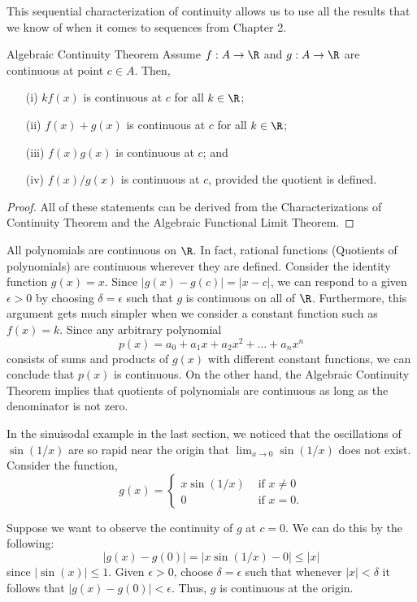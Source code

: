 This sequential characterization of continuity allows us to use all the results that we know of when it comes to sequences from Chapter 2. 


\begin{theorem}{Algebraic Continuity Theorem}{}
    Assume \( f: A \to \R  \) and \( g: A \to \R  \) are continuous at point \( c \in A  \). Then, 
    \begin{enumerate}
        \item[(i)] \( kf(x)  \) is continuous at \( c  \) for all \( k \in \R  \);
        \item[(ii)] \( f(x) + g(x) \) is continuous at \( c  \) for all \( k \in \R  \);
        \item[(iii)] \( f(x) g(x) \) is continuous at \( c  \); and 
        \item[(iv)] \( f(x) / g(x)  \) is continuous at \( c  \), provided the quotient is defined.
    \end{enumerate}
    \end{theorem}

\begin{proof}
All of these statements can be derived from the Characterizations of Continuity Theorem and the Algebraic Functional Limit Theorem.
\end{proof}


\begin{example}{}{}
All polynomials are continuous on \( \R  \). In fact, rational functions (Quotients of polynomials) are continuous wherever they are defined. Consider the identity function \( g(x) = x  \). Since \( | g(x) - g(c) | = | x - c  |  \), we can respond to a given \( \epsilon > 0 \) by choosing \( \delta = \epsilon  \) such that \( g  \) is continuous on all of \( \R  \). Furthermore, this argument gets much simpler when we consider a constant function such as \( f(x) = k  \). Since any arbitrary polynomial 
\[  p(x) = a_0 + a_1 x + a_2 x^2 + \dots + a_n x^n \]
consists of sums and products of \( g(x) \) with different constant functions, we can conclude that \( p(x) \) is continuous. On the other hand, the Algebraic Continuity Theorem implies that quotients of polynomials are continuous as long as the denominator is not zero.
\end{example}

\begin{example}{}{}
In the sinuisodal example in the last section, we noticed that the oscillations of \( \sin (1/x ) \) are so rapid near the origin that \( \lim_{ x \to 0  } \sin (1/x) \) does not exist. Consider the function, 
\[  g(x) = 
\begin{cases}
    x \sin (1/x) &\text{~if~} x \neq 0 \\ 
    0 &\text{~if~}  x = 0. 
\end{cases} \]
\end{example}
Suppose we want to observe the continuity of \( g \) at \( c = 0  \). We can do this by the following:
\[ | g(x) - g(0) | = | x \sin(1/x) - 0  | \leq | x |   \]
since \( | \sin (x)  |  \leq 1 \). Given \( \epsilon > 0 \), choose \( \delta = \epsilon  \) such that whenever \( | x | < \delta \) it follows that \( | g(x) - g(0) | < \epsilon  \). Thus, \( g  \) is continuous at the origin. 


